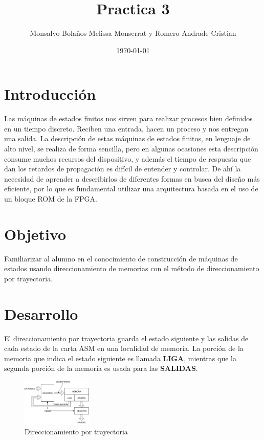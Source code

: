 \documentclass[table]{scrartcl}
\author{Monsalvo Bolaños Melissa Monserrat y Romero Andrade Cristian}
\date{\today}
\title{Practica 3}
\begin{document}

\maketitle{}
\tableofcontents{}
\section{Introducción}
\label{sec:org6bd500f}
Las máquinas de estados finitos nos sirven para realizar procesos bien
definidos en un tiempo discreto. Reciben una entrada, hacen un proceso y nos
entregan una salida.
La descripción de estas máquinas de estados finitos, en lenguaje de alto nivel,
se realiza de forma sencilla, pero en algunas ocasiones esta descripción
consume muchos recursos del dispositivo, y además el tiempo de respuesta que
dan los retardos de propagación es difícil de entender y controlar. De ahí la
necesidad de aprender a describirlos de diferentes formas en busca del diseño
más eficiente, por lo que es fundamental utilizar una arquitectura basada en el
uso de un bloque ROM de la FPGA.
\section{Objetivo}
\label{sec:org8bfa7f0}
Familiarizar al alumno en el conocimiento de construcción de máquinas de
estados usando direccionamiento de memorias con el método de
direccionamiento por trayectoria.
\section{Desarrollo}
\label{sec:orgac7043c}
El direccionamiento por trayectoria guarda el estado siguiente y las salidas de
cada estado de la carta ASM en una localidad de memoria. La porción de la
memoria que indica el estado siguiente es llamada \textbf{LIGA}, mientras que la
segunda porción de la memoria es usada para las \textbf{SALIDAS}.
\begin{figure}[htbp]
  \centering
  \includegraphics[width=0.3\textwidth]{./img/1.png}
  \caption{Direccionamiento por trayectoria}
\end{figure}
\end{document}
